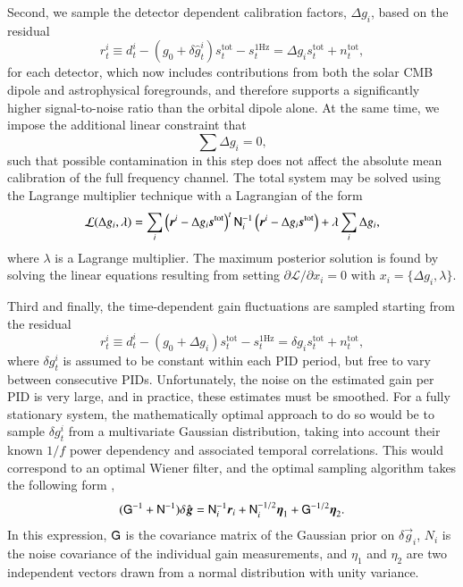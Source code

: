 \documentclass[twocolumn]{aa}
\newcommand{\s}[0]{\vec{s}}
\newcommand{\g}[0]{\vec{g}}
\newcommand{\N}[0]{\tens{N}}
\renewcommand{\r}[0]{\vec{r}}
\begin{document}
Second, we sample the detector dependent calibration factors, $\Delta
g_i$, based on the residual
\begin{equation}
  r^i_t \equiv d^i_{t} - (g_0 + \delta \hat{g}_t^i) s^{\mathrm{tot}}_{t}  - s^{\mathrm{1Hz}}_t
  =  \Delta g_i s^{\mathrm{tot}}_{t} + n^{\mathrm{tot}}_{t},
  \label{eq:g0_res}
\end{equation}
for each detector, which now includes contributions from both the
solar CMB dipole and astrophysical foregrounds, and therefore supports
a significantly higher signal-to-noise ratio than the orbital dipole
alone. At the same time, we impose the additional linear constraint that
\begin{equation}
  \sum \Delta g_i = 0,
\end{equation}
such that possible contamination in this step does not affect the
absolute mean calibration of the full frequency channel. The total
system may be solved using the Lagrange multiplier technique
\citep[e.g.,][]{bertsekas:1996} with a Lagrangian of the form
\begin{equation}
\mathcal{L}(\Delta g_i, \lambda) = \sum_i \left(\r^{i}-\Delta g_i
\s^{\mathrm{tot}}\right)^t \N_i^{-1} \left(\r^{i}-\Delta g_i \s^{\mathrm{tot}}\right) +
\lambda \sum_i \Delta g_i,
\end{equation}
where $\lambda$ is a Lagrange multiplier. The maximum posterior
solution is found by solving the linear equations resulting from setting
$\partial \mathcal{L}/\partial x_i = 0$ with $x_i = \{\Delta g_i,
\lambda\}$. 


Third and finally, the time-dependent gain fluctuations are sampled
starting from the residual 
\begin{equation}
  r^i_t \equiv d^i_{t} - \left(g_0 + \Delta g_i\right) s^{\mathrm{tot}}_{t} - s^{\mathrm{1Hz}}_t
 =  \delta g_i s^{\mathrm{tot}}_{t} + n^{\mathrm{tot}}_{t},
\end{equation}
where $\delta g^i_t$ is assumed to be constant within each PID period,
but free to vary between consecutive PIDs. Unfortunately, the noise on
the estimated gain per PID is very large, and in practice, these
estimates must be smoothed. For a fully stationary system, the
mathematically optimal approach to do so would be to sample $\delta
g^i_t$ from a multivariate Gaussian distribution, taking into account
their known $1/f$ power dependency and associated temporal
correlations. This would correspond to an optimal Wiener filter, and
the optimal sampling algorithm takes the following form \citep{bp07},
\newcommand{\tG}[0]{\tens{G}}
\begin{equation}
    (\tG^{-1} + \N^{-1})\delta \hat{\g} = \N_i^{-1}\r_i + \N_i^{-1/2}\vec\eta_1 + \tG^{-1/2}\vec\eta_2.
    \label{eq:delta_gain_sampling_with_prior}
\end{equation}
In this expression, $\tG$ is the covariance matrix of the Gaussian
prior on $\delta\g_i$, $N_i$ is the noise covariance of the individual
gain measurements, and $\eta_1$ and $\eta_2$ are two independent
vectors drawn from a normal distribution with unity
variance.
\end{document}
